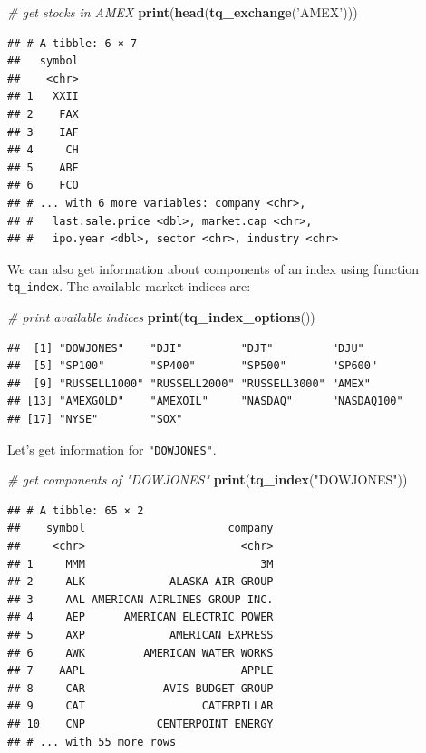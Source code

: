 \documentclass[11pt,]{book}
\newenvironment{Shaded}{\begin{snugshade}}{\end{snugshade}}
\newcommand{\KeywordTok}[1]{\textcolor[rgb]{0.27,0.27,0.27}{\textbf{#1}}}
\newcommand{\StringTok}[1]{\textcolor[rgb]{0.5,0.5,0.5}{#1}}
\newcommand{\CommentTok}[1]{\textcolor[rgb]{0.56,0.35,0.01}{\textit{#1}}}
\newcommand{\NormalTok}[1]{#1}
\begin{document}
\begin{Shaded}
\begin{Highlighting}[]
\CommentTok{# get stocks in AMEX}
\KeywordTok{print}\NormalTok{(}\KeywordTok{head}\NormalTok{(}\KeywordTok{tq_exchange}\NormalTok{(}\StringTok{'AMEX'}\NormalTok{)))}
\end{Highlighting}
\end{Shaded}

\begin{verbatim}
## # A tibble: 6 × 7
##   symbol
##    <chr>
## 1   XXII
## 2    FAX
## 3    IAF
## 4     CH
## 5    ABE
## 6    FCO
## # ... with 6 more variables: company <chr>,
## #   last.sale.price <dbl>, market.cap <chr>,
## #   ipo.year <dbl>, sector <chr>, industry <chr>
\end{verbatim}

We can also get information about components of an index using function
\texttt{tq\_index}. The available market indices are:

\begin{Shaded}
\begin{Highlighting}[]
\CommentTok{# print available indices}
\KeywordTok{print}\NormalTok{(}\KeywordTok{tq_index_options}\NormalTok{())}
\end{Highlighting}
\end{Shaded}

\begin{verbatim}
##  [1] "DOWJONES"    "DJI"         "DJT"         "DJU"        
##  [5] "SP100"       "SP400"       "SP500"       "SP600"      
##  [9] "RUSSELL1000" "RUSSELL2000" "RUSSELL3000" "AMEX"       
## [13] "AMEXGOLD"    "AMEXOIL"     "NASDAQ"      "NASDAQ100"  
## [17] "NYSE"        "SOX"
\end{verbatim}

Let's get information for \texttt{"DOWJONES"}.

\begin{Shaded}
\begin{Highlighting}[]
\CommentTok{# get components of "DOWJONES"}
\KeywordTok{print}\NormalTok{(}\KeywordTok{tq_index}\NormalTok{(}\StringTok{"DOWJONES"}\NormalTok{))}
\end{Highlighting}
\end{Shaded}

\begin{verbatim}
## # A tibble: 65 × 2
##    symbol                      company
##     <chr>                        <chr>
## 1     MMM                           3M
## 2     ALK             ALASKA AIR GROUP
## 3     AAL AMERICAN AIRLINES GROUP INC.
## 4     AEP      AMERICAN ELECTRIC POWER
## 5     AXP             AMERICAN EXPRESS
## 6     AWK         AMERICAN WATER WORKS
## 7    AAPL                        APPLE
## 8     CAR            AVIS BUDGET GROUP
## 9     CAT                  CATERPILLAR
## 10    CNP           CENTERPOINT ENERGY
## # ... with 55 more rows
\end{verbatim}
\end{document}
